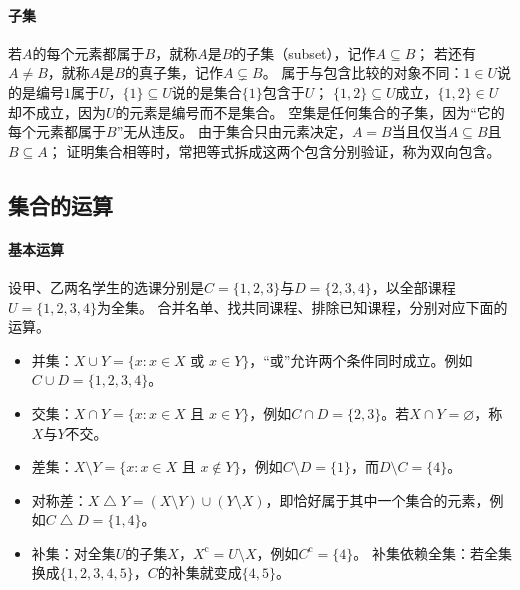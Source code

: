 \paragraph{子集}
若$A$的每个元素都属于$B$，就称$A$是$B$的子集（subset），记作$A\subseteq B$；
若还有$A\neq B$，就称$A$是$B$的真子集，记作$A\subsetneq B$。
属于与包含比较的对象不同：$1\in U$说的是编号$1$属于$U$，$\{1\}\subseteq U$说的是集合$\{1\}$包含于$U$；
$\{1,2\}\subseteq U$成立，$\{1,2\}\in U$却不成立，因为$U$的元素是编号而不是集合。
空集是任何集合的子集，因为“它的每个元素都属于$B$”无从违反。
由于集合只由元素决定，$A=B$当且仅当$A\subseteq B$且$B\subseteq A$；
证明集合相等时，常把等式拆成这两个包含分别验证，称为双向包含。

\subsection{集合的运算}
\label{sec:prelim-set-operations}

\paragraph{基本运算}
设甲、乙两名学生的选课分别是$C=\{1,2,3\}$与$D=\{2,3,4\}$，以全部课程$U=\{1,2,3,4\}$为全集。
合并名单、找共同课程、排除已知课程，分别对应下面的运算。
\begin{itemize}
 \item 并集：$X\cup Y=\{x:x\in X\text{ 或 }x\in Y\}$，“或”允许两个条件同时成立。例如$C\cup D=\{1,2,3,4\}$。
 \item 交集：$X\cap Y=\{x:x\in X\text{ 且 }x\in Y\}$，例如$C\cap D=\{2,3\}$。若$X\cap Y=\varnothing$，称$X$与$Y$不交。
 \item 差集：$X\setminus Y=\{x:x\in X\text{ 且 }x\notin Y\}$，例如$C\setminus D=\{1\}$，而$D\setminus C=\{4\}$。
 \item 对称差：$X\mathbin{\triangle}Y=(X\setminus Y)\cup(Y\setminus X)$，即恰好属于其中一个集合的元素，例如$C\mathbin{\triangle}D=\{1,4\}$。
 \item 补集：对全集$U$的子集$X$，$X^{\mathrm c}=U\setminus X$，例如$C^{\mathrm c}=\{4\}$。
       补集依赖全集：若全集换成$\{1,2,3,4,5\}$，$C$的补集就变成$\{4,5\}$。
\end{itemize}

